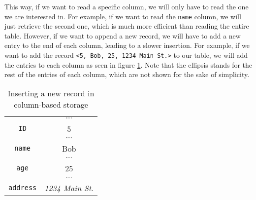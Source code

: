 This way, if we want to read a specific column, we will only have to read the one we are interested in. For example, if we want to read the \texttt{name} column, we will just retrieve the second one, which is much more efficient than reading the entire table. However, if we want to append a new record, we will have to add a new entry to the end of each column, leading to a slower insertion. For example, if we want to add the record \texttt{<5, Bob, 25, 1234 Main St.>} to our table, we will add the entries to each column as seen in figure \ref{tab:column_based}. Note that the ellipsis stands for the rest of the entries of each column, which are not shown for the sake of simplicity.

\begin{table}[ht]
    \centering
    \begin{tabular}{|c|c|}
        \hline
        \cellcolor[HTML]{EFEFEF}                                   & $\cdots$               \\ \cline{2-2}
        \multirow{-2}{*}{\cellcolor[HTML]{EFEFEF}\texttt{ID}}      & 5                      \\ \hline
        \cellcolor[HTML]{EFEFEF}                                   & $\cdots$               \\ \cline{2-2}
        \multirow{-2}{*}{\cellcolor[HTML]{EFEFEF}\texttt{name}}    & Bob                    \\ \hline
        \cellcolor[HTML]{EFEFEF}                                   & $\cdots$               \\ \cline{2-2}
        \multirow{-2}{*}{\cellcolor[HTML]{EFEFEF}\texttt{age}}     & 25                     \\ \hline
        \cellcolor[HTML]{EFEFEF}                                   & $\cdots$               \\ \cline{2-2}
        \multirow{-2}{*}{\cellcolor[HTML]{EFEFEF}\texttt{address}} & \textit{1234 Main St.} \\ \hline
    \end{tabular}
    \caption{Inserting a new record in column-based storage}
    \label{tab:column_based}
\end{table}

